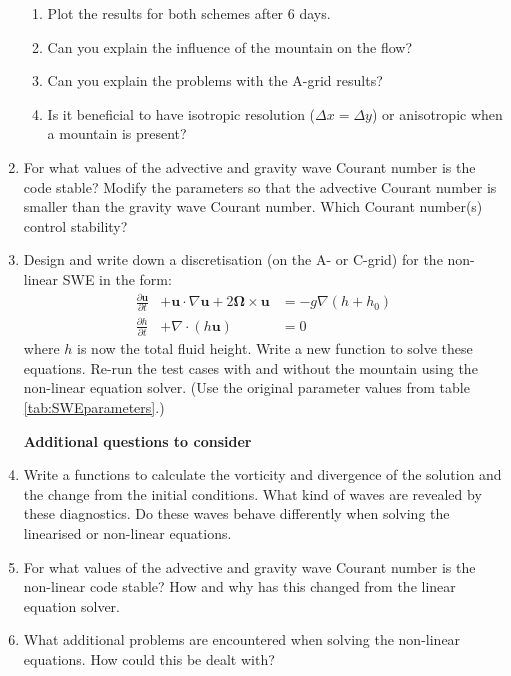 \begin{enumerate}
\begin{enumerate}
\item Plot the results for both schemes after 6 days. 
\item Can you explain the influence of the mountain on the flow?
\item Can you explain the problems with the A-grid results?
\item Is it beneficial to have isotropic resolution ($\Delta x=\Delta y$)
or anisotropic when a mountain is present?
\end{enumerate}
\item For what values of the advective and gravity wave Courant number is
the code stable? Modify the parameters so that the advective Courant
number is smaller than the gravity wave Courant number. Which Courant
number(s) control stability?
\item Design and write down a discretisation (on the A- or C-grid) for the
non-linear SWE in the form:
\begin{eqnarray}
\frac{\partial\mathbf{u}}{\partial t} & +\mathbf{u}\cdot\nabla\mathbf{u}+2\bm{\Omega}\times\mathbf{u} & =-g\nabla\left(h+h_{0}\right)\\
\frac{\partial h}{\partial t} & +\nabla\cdot\left(h\mathbf{u}\right) & =0
\end{eqnarray}
where $h$ is now the total fluid height. Write a new function to
solve these equations. Re-run the test cases with and without the
mountain using the non-linear equation solver. (Use the original parameter
values from table \ref{tab:SWEparameters}.)


\textbf{Additional questions to consider}

\item Write a functions to calculate the vorticity and divergence of the
solution and the change from the initial conditions. What kind of
waves are revealed by these diagnostics. Do these waves behave differently
when solving the linearised or non-linear equations.
\item For what values of the advective and gravity wave Courant number is
the non-linear code stable? How and why has this changed from the
linear equation solver.
\item What additional problems are encountered when solving the non-linear
equations. How could this be dealt with?\end{enumerate}

